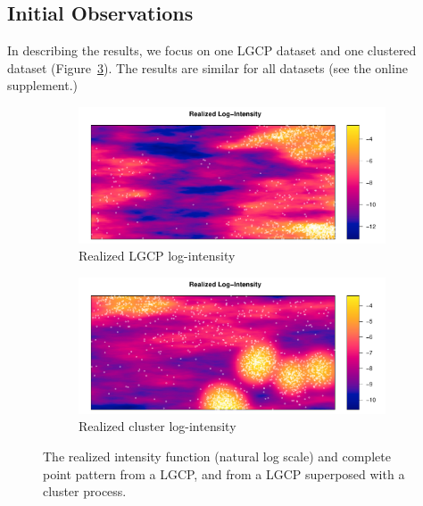 \documentclass[review]{elsarticle}
\begin{document}

\subsection{Initial Observations}

In describing the results, we focus on one LGCP dataset and one clustered
dataset (Figure~\ref{fulldata}). The results are similar for all datasets (see
the online supplement.)

\begin{figure}

\begin{subfigure}{5in}
\includegraphics[width=5in]{../graphics/lambda-LGCP000004.pdf}
\caption{Realized LGCP log-intensity}
\label{labmdalgcp}
\end{subfigure}

\begin{subfigure}{5in}
\includegraphics[width=5in]{../graphics/lambda-Cluster000004.pdf}
\caption{Realized cluster log-intensity}
\label{lambdacluster}
\end{subfigure}

\caption{The realized intensity function (natural log scale) and complete
point pattern from a LGCP, and from a LGCP superposed with a cluster process.}
\label{fulldata}
\end{figure}
\end{document}
